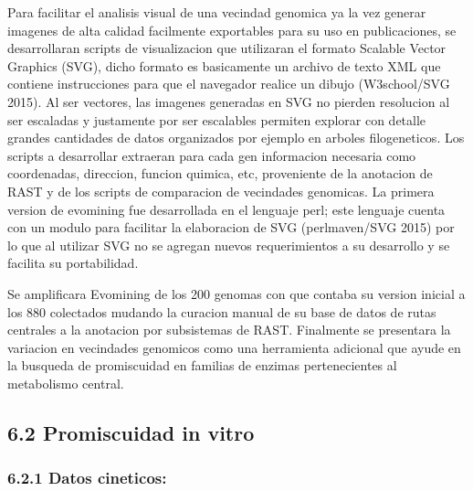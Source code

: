 \documentclass[12pt,twoside]{reedthesis}
\begin{document}
  Para facilitar el analisis visual de una vecindad genomica ya la vez
  generar imagenes de alta calidad facilmente exportables para su uso en
  publicaciones, se desarrollaran scripts de visualizacion que utilizaran
  el formato Scalable Vector Graphics (SVG), dicho formato es basicamente
  un archivo de texto XML que contiene instrucciones para que el navegador
  realice un dibujo (W3school/SVG 2015). Al ser vectores, las imagenes
  generadas en SVG no pierden resolucion al ser escaladas y justamente por
  ser escalables permiten explorar con detalle grandes cantidades de datos
  organizados por ejemplo en arboles filogeneticos. Los scripts a
  desarrollar extraeran para cada gen informacion necesaria como
  coordenadas, direccion, funcion quimica, etc, proveniente de la
  anotacion de RAST y de los scripts de comparacion de vecindades
  genomicas. La primera version de evomining fue desarrollada en el
  lenguaje perl; este lenguaje cuenta con un modulo para facilitar la
  elaboracion de SVG (perlmaven/SVG 2015) por lo que al utilizar SVG no se
  agregan nuevos requerimientos a su desarrollo y se facilita su
  portabilidad.
  
  Se amplificara Evomining de los 200 genomas con que contaba su version
  inicial a los 880 colectados mudando la curacion manual de su base de
  datos de rutas centrales a la anotacion por subsistemas de RAST.
  Finalmente se presentara la variacion en vecindades genomicos como una
  herramienta adicional que ayude en la busqueda de promiscuidad en
  familias de enzimas pertenecientes al metabolismo central.
  
  \subsection{6.2 Promiscuidad in vitro}\label{promiscuidad-in-vitro}
  
  \subsubsection{6.2.1 Datos cineticos:}\label{datos-cineticos}
  
\end{document}
